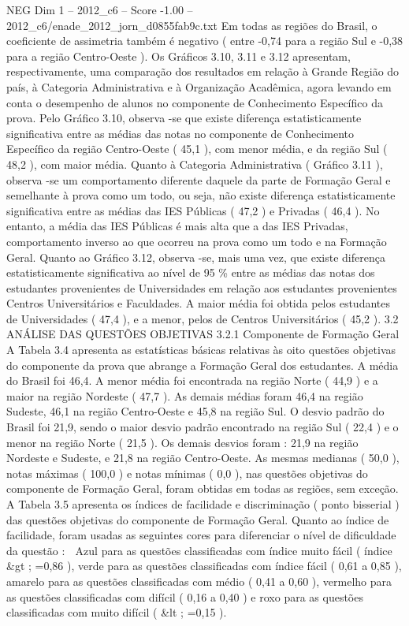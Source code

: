 \begin{textsample}{NEG Dim 1 – 2012\_c6 – Score -1.00 – 2012\_c6/enade\_2012\_jorn\_d0855fab9c.txt}
Em todas as regiões do Brasil, o coeficiente de assimetria também é negativo ( entre -0,74 para a região Sul e -0,38 para a região Centro-Oeste ).
Os Gráficos 3.10, 3.11 e 3.12 apresentam, respectivamente, uma comparação dos resultados em relação à Grande Região do país, à Categoria Administrativa e à Organização Acadêmica, agora levando em conta o desempenho de alunos no componente de Conhecimento Específico da prova.
Pelo Gráfico 3.10, observa -se que existe diferença estatisticamente significativa entre as médias das notas no componente de Conhecimento Específico da região Centro-Oeste ( 45,1 ), com menor média, e da região Sul ( 48,2 ), com maior média.
Quanto à Categoria Administrativa ( Gráfico 3.11 ), observa -se um comportamento diferente daquele da parte de Formação Geral e semelhante à prova como um todo, ou seja, não existe diferença estatisticamente significativa entre as médias das IES Públicas ( 47,2 ) e Privadas ( 46,4 ).
No entanto, a média das IES Públicas é mais alta que a das IES Privadas, comportamento inverso ao que ocorreu na prova como um todo e na Formação Geral.
Quanto ao Gráfico 3.12, observa -se, mais uma vez, que existe diferença estatisticamente significativa ao nível de 95 \% entre as médias das notas dos estudantes provenientes de Universidades em relação aos estudantes provenientes Centros Universitários e Faculdades.
A maior média foi obtida pelos estudantes de Universidades ( 47,4 ), e a menor, pelos de Centros Universitários ( 45,2 ). 3.2 ANÁLISE DAS QUESTÕES OBJETIVAS 3.2.1 Componente de Formação Geral A Tabela 3.4 apresenta as estatísticas básicas relativas às oito questões objetivas do componente da prova que abrange a Formação Geral dos estudantes.
A média do Brasil foi 46,4.
A menor média foi encontrada na região Norte ( 44,9 ) e a maior na região Nordeste ( 47,7 ).
As demais médias foram 46,4 na região Sudeste, 46,1 na região Centro-Oeste e 45,8 na região Sul.
O desvio padrão do Brasil foi 21,9, sendo o maior desvio padrão encontrado na região Sul ( 22,4 ) e o menor na região Norte ( 21,5 ).
Os demais desvios foram : 21,9 na região Nordeste e Sudeste, e 21,8 na região Centro-Oeste.
As mesmas medianas ( 50,0 ), notas máximas ( 100,0 ) e notas mínimas ( 0,0 ), nas questões objetivas do componente de Formação Geral, foram obtidas em todas as regiões, sem exceção.
A Tabela 3.5 apresenta os índices de facilidade e discriminação ( ponto bisserial ) das questões objetivas do componente de Formação Geral.
Quanto ao índice de facilidade, foram usadas as seguintes cores para diferenciar o nível de dificuldade da questão :  Azul para as questões classificadas com índice muito fácil ( índice \&gt ; =0,86 ), verde para as questões classificadas com índice fácil ( 0,61 a 0,85 ), amarelo para as questões classificadas com médio ( 0,41 a 0,60 ), vermelho para as questões classificadas com difícil ( 0,16 a 0,40 ) e roxo para as questões classificadas com muito difícil ( \&lt ; =0,15 ).

\end{textsample}
